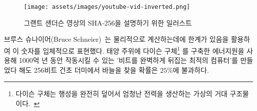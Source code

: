 \begin{comment}
	\begin{figure}
		\texttt{[image: assets/images/youtube-vid-inverted.png]}
		\caption{Illustration of SHA-256 security. Original graphic by Grant Sanderson aka 3Blue1Brown.}
		\label{fig:youtube-vid-inverted}
	\end{figure}
\end{comment}
\begin{figure}
	\texttt{[image: assets/images/youtube-vid-inverted.png]}
	\caption{그랜트 샌더슨 영상의 SHA-256을 설명하기 위한 일러스트}
	\label{fig:youtube-vid-inverted}
\end{figure}

\begin{comment}
	Bruce Schneier~\cite{web:schneier} used the physical limits of computation to put this
	number into perspective: even if we could build an optimal computer,
	which would use any provided energy to flip bits perfectly~\cite{wiki:landauer}, build a
	Dyson sphere\footnote{A Dyson sphere is a hypothetical megastructure that completely encompasses a star and captures a large percentage of its power output.~\cite{wiki:dyson}} around our sun, and let it run for 100 billion billion
	years, we would still only have a $25\%$ chance to find a needle in a
	256-bit haystack.
\end{comment}
브루스 슈나이어(Bruce Schneier)~\cite{web:schneier}는 물리적으로 계산하는데에 한계가 있음을 활용하여 이 숫자를 입체적으로 표현했다.
태양 주위에 다이슨 구체\footnote{다이슨 구체는 행성을 완전히 덮어서 엄청난 전력을 생산하는 가상의 거대 구조물이다.~\cite{wiki:dyson}}
를 구축한 에너지원을 사용해 1000억 년 동안 작동시킬 수 있는 '비트를 완벽하게 뒤집는 최적의 컴퓨터'를 만들었다 해도 256비트 건초 더미에서 바늘을 찾을 확률은 $25\%$에 불과하다.

